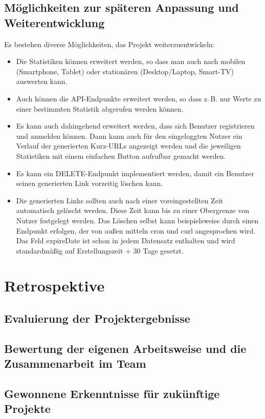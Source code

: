 \documentclass[a4paper,11pt,DIV=12,overfullrule=on]{scrreprt}%
\begin{document}
\section{Möglichkeiten zur späteren Anpassung und Weiterentwicklung}
Es bestehen diverse Möglichkeiten, das Projekt weiterzuentwickeln:
\begin{itemize}
\item Die Statistiken können erweitert werden, so dass man auch nach mobilen (Smartphone, Tablet) oder stationären (Desktop/Laptop, Smart-TV) auswerten kann.
\item Auch können die \ac{API}-Endpunkte erweitert werden, so dass z.\,B. nur Werte zu einer bestimmten Statistik abgerufen werden können.
\item Es kann auch dahingehend erweitert werden, dass sich Benutzer registrieren und anmelden können. Dann kann auch für den eingeloggten Nutzer ein Verlauf der generierten Kurz-\ac{URL}s angezeigt werden und die jeweiligen Statistiken mit einem einfachen Button aufrufbar gemacht werden.
\item Es kann ein DELETE-Endpunkt implementiert werden, damit ein Benutzer seinen generierten Link vorzeitig löschen kann.
\item Die generierten Links sollten auch nach einer voreingestellten Zeit automatisch gelöscht werden. Diese Zeit kann bis zu einer Obergrenze von Nutzer festgelegt werden. Das Löschen selbst kann beispielsweise durch einen Endpunkt erfolgen, der von außen mitteln {\ttfamily cron} und {\ttfamily curl} angesprochen wird. Das Feld {\ttfamily expireDate} ist schon in jedem Datensatz enthalten und wird standardmäßig auf Erstellungszeit + 30 Tage gesetzt.
\end{itemize}

\chapter{Retrospektive}
\section{Evaluierung der Projektergebnisse}
\section{Bewertung der eigenen Arbeitsweise und die Zusammenarbeit im Team}
\section{Gewonnene Erkenntnisse für zukünftige Projekte}
\end{document}
